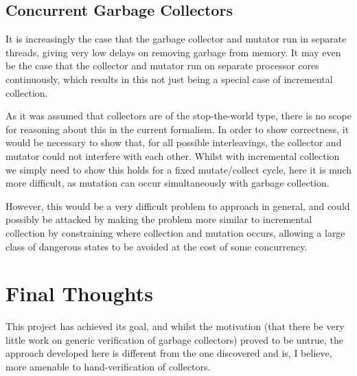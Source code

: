 \subsection{Concurrent Garbage Collectors}
\label{sec:conclusion-further-concurrent}

It is increasingly the case that the garbage collector and mutator run
in separate threads, giving very low delays on removing garbage from
memory. It may even be the case that the collector and mutator run on
separate processor cores continuously, which results in this not just
being a special case of incremental collection.

As it was assumed that collectors are of the stop-the-world type,
there is no scope for reasoning about this in the current
formalism. In order to show correctness, it would be necessary to show
that, for all possible interleavings, the collector and mutator could
not interfere with each other. Whilst with incremental collection we
simply need to show this holds for a fixed mutate/collect cycle, here
it is much more difficult, as mutation can occur simultaneously with
garbage collection.

However, this would be a very difficult problem to approach in
general, and could possibly be attacked by making the problem more
similar to incremental collection by constraining where collection and
mutation occurs, allowing a large class of dangerous states to be
avoided at the cost of some concurrency.

\section{Final Thoughts}
\label{sec:conclusion-thoughts}

This project has achieved its goal, and whilst the motivation (that
there be very little work on generic verification of garbage
collectors) proved to be untrue, the approach developed here is
different from the one discovered and is, I believe, more amenable to
hand-verification of collectors.
